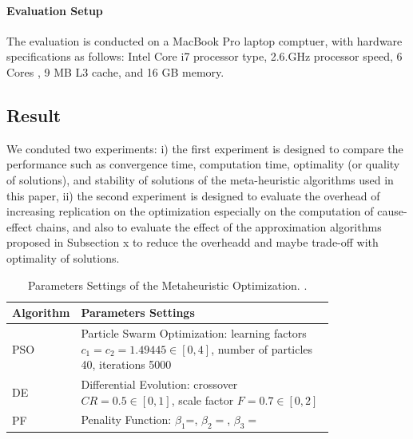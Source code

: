 \paragraph{Evaluation Setup} The evaluation is conducted on a MacBook Pro laptop comptuer, with hardware specifications as follows: Intel Core i7 processor type, 2.6.GHz processor speed, 6 Cores , 9 MB L3 cache, and 16 GB memory.

\subsection{Result}
We conduted two experiments: i) the first experiment is designed to compare the performance  such as convergence time, computation time, optimality (or quality of solutions), and stability of solutions of the meta-heuristic algorithms used in this paper, ii) the second experiment is designed to evaluate the overhead of increasing replication on the optimization especially on the computation of cause-effect chains, and also to evaluate the effect of the approximation algorithms proposed in Subsection x to reduce the overheadd and maybe trade-off with optimality of solutions.
\begin{table}
	\centering\small
	\begin{tabular}{@{}lp{0.8\linewidth}@{}}
		\toprule
		Algorithm & Parameters Settings\\ 
		\midrule
		PSO	& Particle Swarm Optimization: learning factors $c_1=c_2=1.49445\in [0,4]$,  number of particles 40, iterations 5000	\\
		DE	& Differential Evolution: crossover $CR=0.5\in[0,1]$, scale factor $F=0.7\in[0,2]$  \\
		PF& Penality Function:  $\beta_1$=,  $\beta_2=$, $ \beta_3=$\\
		\bottomrule
	\end{tabular}
	\caption{Parameters Settings of the Metaheuristic Optimization. .}
	\label{tbl_para}
\end{table}

